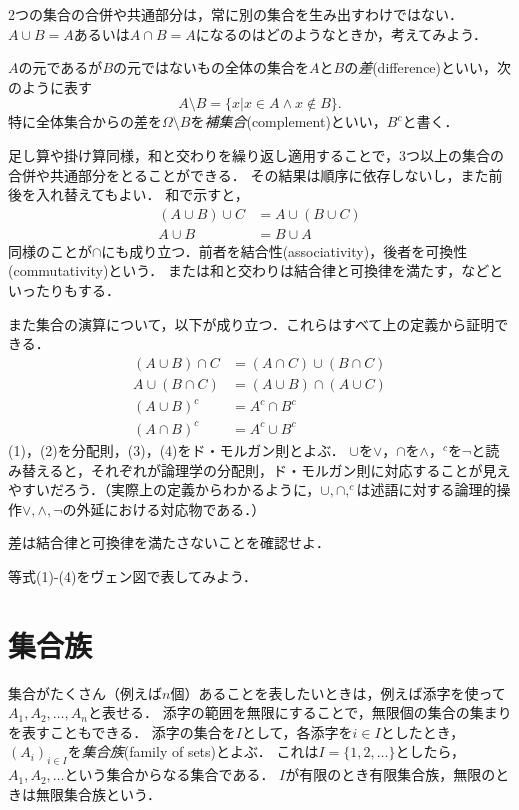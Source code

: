 \documentclass[11pt,a4paper]{jsarticle}
\begin{document}
\begin{attn}
 2つの集合の合併や共通部分は，常に別の集合を生み出すわけではない．$A \cup B = A$あるいは$A \cap B = A$になるのはどのようなときか，考えてみよう．
\end{attn}


$A$の元であるが$B$の元ではないもの全体の集合を$A$と$B$の\emph{差}(difference)といい，次のように表す
\[
 A \setminus B = \{ x | x \in A \wedge x \not\in B\}.
\]
特に全体集合からの差を$\Omega \setminus B$を\emph{補集合}(complement)といい，$B^c$と書く．

足し算や掛け算同様，和と交わりを繰り返し適用することで，3つ以上の集合の合併や共通部分をとることができる．
その結果は順序に依存しないし，また前後を入れ替えてもよい．
和で示すと，
\begin{align*}
 (A \cup B) \cup C & = A \cup (B \cup C) \\
 A \cup B & = B \cup A
\end{align*}
同様のことが$\cap$にも成り立つ．前者を結合性(associativity)，後者を可換性(commutativity)という．
または和と交わりは結合律と可換律を満たす，などといったりもする．

また集合の演算について，以下が成り立つ．これらはすべて上の定義から証明できる．
\begin{align}
(A \cup B) \cap C &= (A \cap C) \cup (B \cap C) \\
A \cup (B \cap C) &= (A \cup B) \cap (A \cup C) \\
(A \cup B)^c &= A^c \cap B^c \\
(A \cap B)^c &= A^c \cup B^c
\end{align}
(1)，(2)を分配則，(3)，(4)をド・モルガン則とよぶ．
$\cup$を$\vee$，$\cap$を$\wedge$，$^c$を$\neg$と読み替えると，それぞれが論理学の分配則，ド・モルガン則に対応することが見えやすいだろう．（実際上の定義からわかるように，$\cup, \cap, ^c$は述語に対する論理的操作$\vee, \wedge, \neg$の外延における対応物である．）

\begin{exercise}
差は結合律と可換律を満たさないことを確認せよ．
\end{exercise}


\begin{exercise}
等式(1)-(4)をヴェン図で表してみよう．
\end{exercise}



\section{集合族}
集合がたくさん（例えば$n$個）あることを表したいときは，例えば添字を使って$A_1, A_2, \dots, A_n$と表せる．
添字の範囲を無限にすることで，無限個の集合の集まりを表すこともできる．
添字の集合を$I$として，各添字を$i \in I$としたとき，$(A_i)_{i\in I}$を\emph{集合族}(family of sets)とよぶ．
これは$I = \{1, 2,  \dots\}$としたら，$A_1, A_2, \dots$という集合からなる集合である．
$I$が有限のとき有限集合族，無限のときは無限集合族という．
\end{document}
